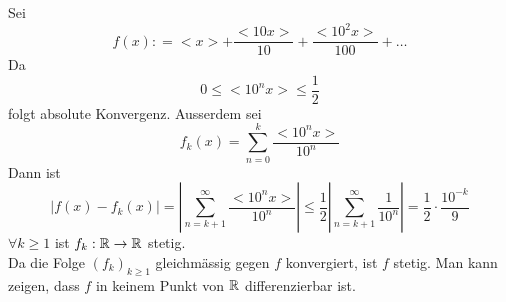 Sei
\[f\left( x \right): =  < x >  + \frac{{ < 10x > }}{{10}} + \frac{{ < {{10}^2}x > }}{{100}} +  \ldots \]
Da
\[0 \le  < {10^n}x >  \le \frac{1}{2}\]
folgt absolute Konvergenz. Ausserdem sei
\[{f_k}\left( x \right) = \sum\limits_{n = 0}^k {\frac{{ < {{10}^n}x > }}{{{{10}^n}}}} \]
Dann ist
\[\left| {f\left( x \right) - {f_k}\left( x \right)} \right| = \left| {\sum\limits_{n = k + 1}^\infty  {\frac{{ < {{10}^n}x > }}{{{{10}^n}}}} } \right| \le \frac{1}{2}\left| {\sum\limits_{n = k + 1}^\infty  {\frac{1}{{{{10}^n}}}} } \right| = \frac{1}{2} \cdot \frac{{{{10}^{ - k}}}}{9}\]
$\forall k\geq 1$ ist $f_k:\mathbb{R}\to\mathbb{R}$ stetig. \\

Da die Folge $\left( f_k\right)_{k\geq 1}$ gleichmässig gegen $f$ konvergiert, ist $f$ stetig. Man kann zeigen, dass $f$ in keinem Punkt von $\mathbb{R}$ differenzierbar ist. 
